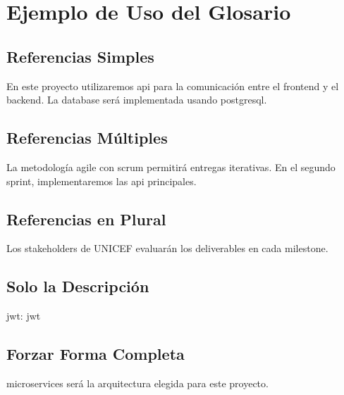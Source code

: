 
\section{Ejemplo de Uso del Glosario}

\subsection{Referencias Simples}

En este proyecto utilizaremos \gls{api} para la comunicación entre el \gls{frontend} 
y el \gls{backend}. La \gls{database} será implementada usando \gls{postgresql}.

\subsection{Referencias Múltiples}

La metodología \gls{agile} con \gls{scrum} permitirá entregas iterativas. 
En el segundo \gls{sprint}, implementaremos las \gls{api} principales.

\subsection{Referencias en Plural}

Los \glspl{stakeholder} de UNICEF evaluarán los \glspl{deliverable} en cada \gls{milestone}.

\subsection{Solo la Descripción}

\gls{jwt}: \glsdesc{jwt}

\subsection{Forzar Forma Completa}

\Gls{microservices} será la arquitectura elegida para este proyecto.

